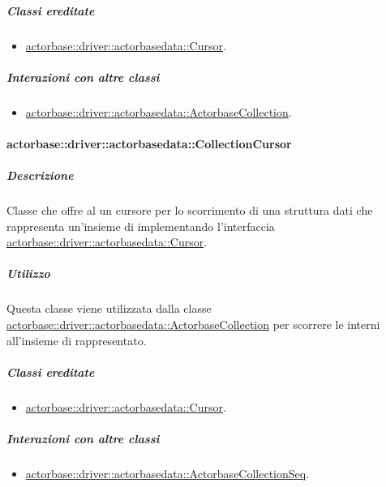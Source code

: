\documentclass{scalatekids-article}
\begin{document}
\subparagraph{Classi ereditate}

\begin{itemize}
\item \hyperref[sec:actorbase::driver::actorbasedata::Cursor]{actorbase::driver::actorbasedata::Cursor}.
\end{itemize}

\subparagraph{Interazioni con altre classi}

\begin{itemize}
\item \hyperref[sec:actorbase::driver::actorbasedata::ActorbaseCollection]{actorbase::driver::actorbasedata::ActorbaseCollection}.
\end{itemize}

\paragraph{actorbase::driver::actorbasedata::CollectionCursor}
\label{sec:actorbase::driver::actorbasedata::CollectionCursor}

\subparagraph{Descrizione}

Classe che offre al  un cursore per lo scorrimento di una struttura dati
che rappresenta un'insieme di  implementando l'interfaccia
\hyperref[sec:actorbase::driver::actorbasedata::Cursor]{actorbase::driver::actorbasedata::Cursor}.

\subparagraph{Utilizzo}

Questa classe viene utilizzata dalla classe
\hyperref[sec:actorbase::driver::actorbasedata::ActorbaseCollection]{actorbase::driver::actorbasedata::ActorbaseCollection}
per scorrere le  interni all'insieme di 
rappresentato.

\subparagraph{Classi ereditate}

\begin{itemize}
\item \hyperref[sec:actorbase::driver::actorbasedata::Cursor]{actorbase::driver::actorbasedata::Cursor}.
\end{itemize}

\subparagraph{Interazioni con altre classi}

\begin{itemize}
\item \hyperref[sec:actorbase::driver::actorbasedata::ActorbaseCollectionSeq]{actorbase::driver::actorbasedata::ActorbaseCollectionSeq}.
\end{itemize}
\end{document}

